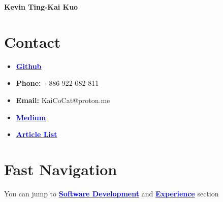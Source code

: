 \documentclass[11pt]{article}
\begin{document}
\begin{center}
    \LARGE \textbf{Kevin Ting-Kai Kuo}
\end{center}

\vspace{1em}

\begin{multicols*}{2}
    





\section*{Contact}
{\footnotesize
\begin{itemize}[noitemsep]
    \item \href{https://github.com/Kuo-TingKai}{\textbf{\textcolor{blue}{Github}}}
    \item \textbf{Phone:} +886-922-082-811
    \item \textbf{Email:} KaiCoCat@proton.me
    \item \href{https://medium.com/@nehsm30126}{\textbf{\textcolor{blue}{Medium}}} 
    \item \href{https://www.overleaf.com/read/xzdtxtgxtnby#49163b}{\textbf{\textcolor{blue}{Article List}}}\\
\end{itemize}
}

\section*{Fast Navigation}
You can jump to \href{#software-dev}{\textbf{\textcolor{blue}{Software Development}}} and \href{#experience}{\textbf{\textcolor{blue}{Experience}}} section\\


\end{multicols*}
\end{document}
